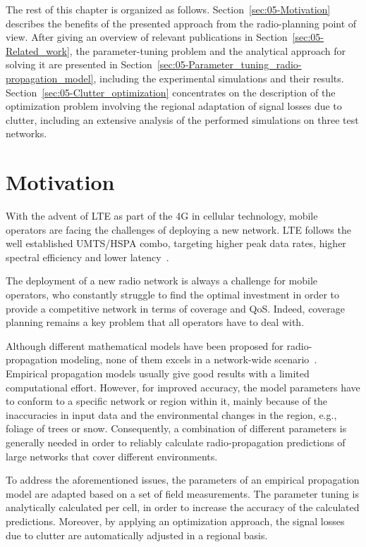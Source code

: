 The rest of this chapter is organized as follows. Section~\ref{sec:05-Motivation}
describes the benefits of the presented approach from the radio-planning
point of view. After giving an overview of relevant publications in
Section~\ref{sec:05-Related_work}, the parameter-tuning problem
and the analytical approach for solving it are presented in Section~\ref{sec:05-Parameter_tuning_radio-propagation_model},
including the experimental simulations and their results. Section~\ref{sec:05-Clutter_optimization}
concentrates on the description of the optimization problem involving
the regional adaptation of signal losses due to clutter, including
an extensive analysis of the performed simulations on three test networks.


\section{Motivation \label{sec:05-Motivation}}

With the advent of LTE as part of the 4G in cellular technology, mobile
operators are facing the challenges of deploying a new network. LTE
follows the well established UMTS/HSPA combo, targeting higher peak
data rates, higher spectral efficiency and lower latency~\cite{Song_Evolved_cellular_network_planning_and_optimization_for_UMTS_and_LTE:2010}. 

The deployment of a new radio network is always a challenge for mobile
operators, who constantly struggle to find the optimal investment
in order to provide a competitive network in terms of coverage and
QoS. Indeed, coverage planning remains a key problem that all operators
have to deal with.

Although different mathematical models have been proposed for radio-propagation
modeling, none of them excels in a network-wide scenario~\cite{Shabbir_Comparison_of_radio_propagation_models:2011}.
Empirical propagation models usually give good results with a limited
computational effort. However, for improved accuracy, the model parameters
have to conform to a specific network or region within it, mainly
because of the inaccuracies in input data and the environmental changes
in the region, e.g., foliage of trees or snow. Consequently, a combination
of different parameters is generally needed in order to reliably calculate
radio-propagation predictions of large networks that cover different
environments.

To address the aforementioned issues, the parameters of an empirical
propagation model are adapted based on a set of field measurements.
The parameter tuning is analytically calculated per cell, in order
to increase the accuracy of the calculated predictions. Moreover,
by applying an optimization approach, the signal losses due to clutter
are automatically adjusted in a regional basis.

